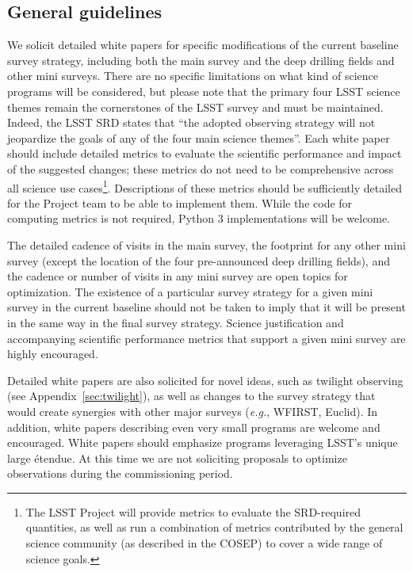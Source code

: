 \documentclass[DM,toc,usenatbib]{lsstdoc}
\begin{document}
\subsection{General guidelines} 

We solicit detailed white papers for specific modifications of the current baseline survey strategy, including 
both the main survey and the deep drilling fields and other mini surveys. There are no 
specific limitations on what kind of science programs will be considered, but please note that 
the primary four LSST science themes remain the cornerstones of the LSST survey and must be
maintained. Indeed, the LSST SRD states that ``the adopted observing 
strategy will not jeopardize the goals of any of the four main science themes''. Each white paper should
include detailed metrics to evaluate the scientific performance and impact of the suggested changes; these metrics
do not need to be comprehensive across all science use cases\footnote{The LSST Project will provide metrics to evaluate
the SRD-required quantities, as well as run a combination of metrics contributed by the general science community
(as described in the COSEP) to cover a wide range of science goals.}. Descriptions of these metrics should be 
sufficiently detailed for the Project team
to be able to implement them. While the code for computing metrics is not required, Python 3 implementations
will be welcome. 

The detailed cadence of visits in the main survey, the footprint for any other mini survey (except the location of the four pre-announced
deep drilling fields), and the cadence or number of visits in any mini survey are open topics for optimization. The existence of a 
particular survey strategy for a given mini survey in the current baseline should not be taken to imply that it will be present in the same way in the final 
survey strategy. Science justification and accompanying scientific performance metrics that support a given mini survey are highly encouraged.

Detailed white papers are also solicited for novel ideas, such as twilight observing (see Appendix~\ref{sec:twilight}), 
as well as changes to the survey strategy that would create synergies with other major surveys ({\it e.g.}, WFIRST, Euclid). 
In addition, white papers describing even very small programs are welcome and encouraged. 
White papers should emphasize programs leveraging LSST's unique large \'{e}tendue.  
At this time we are not soliciting proposals to optimize observations during the commissioning period.
\end{document}
